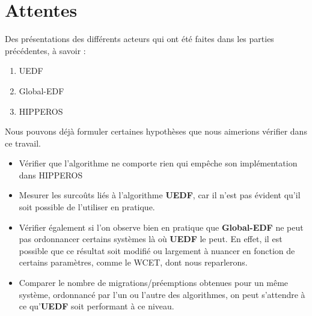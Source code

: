 		
\section{Attentes}

	Des présentations des différents acteurs qui ont été faites dans les parties précédentes, à savoir :
	\begin{enumerate}
		\setlength\itemsep{0.1em}
		\item UEDF
		\item Global-EDF
		\item HIPPEROS
	\end{enumerate}
	Nous pouvons déjà formuler certaines hypothèses que nous aimerions vérifier dans ce travail. \newline
	
	\begin{itemize}
		\item Vérifier que l'algorithme ne comporte rien qui empêche son implémentation dans 
		HIPPEROS
		\item Mesurer les surcoûts liés à l'algorithme \textbf{UEDF}, car il n'est pas 
		évident qu'il soit possible de l'utiliser en pratique.
		\item Vérifier également si l'on observe bien en pratique que \textbf{Global-EDF} ne 
		peut pas ordonnancer certains systèmes là où \textbf{UEDF} le peut.
		En effet, il est possible que ce résultat soit modifié ou largement à nuancer en 
		fonction de certains paramètres, comme le WCET, dont nous reparlerons.
		\item Comparer le nombre de migrations/préemptions obtenues pour un même système, ordonnancé 
		par l'un ou l'autre des algorithmes, on peut s'attendre à ce qu'\textbf{UEDF} soit performant à ce niveau.
	\end{itemize}

